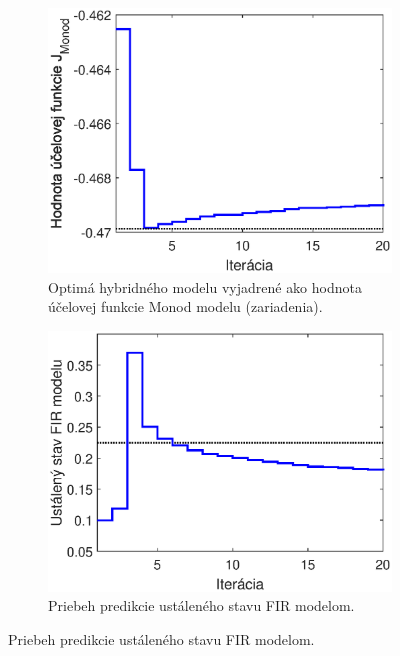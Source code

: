 \begin{figure}
	\centering
	\begin{subfigure}[b]{0.49\textwidth}
		\centering
		\includegraphics[width=\linewidth]{images/hybrid_bio_costFun}
		\caption{Optimá hybridného modelu vyjadrené ako hodnota účelovej funkcie Monod modelu (zariadenia).}
		\label{fig:hybrid_bio_costFun}
	\end{subfigure}
	\hfill
	\begin{subfigure}[b]{0.49\textwidth}
		\centering
		\includegraphics[width=\linewidth]{images/hybrid_bio_ss}
		\caption{Priebeh predikcie ustáleného stavu FIR modelom. \newline}
		\label{fig:hybrid_bio_ss}

\end{subfigure}
\end{figure}
